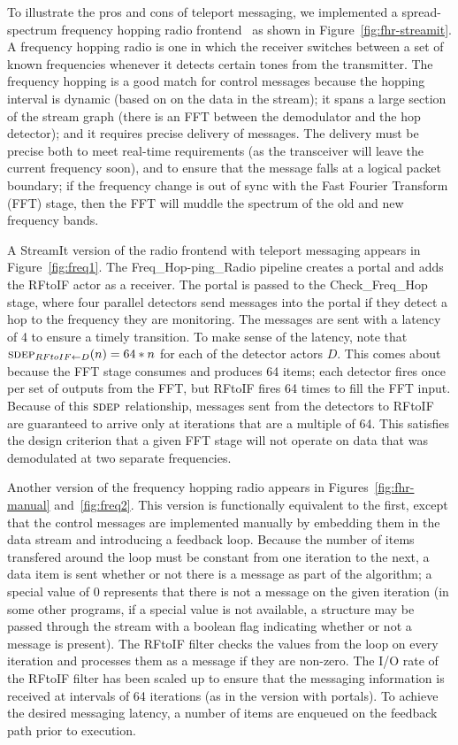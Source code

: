 To illustrate the pros and cons of teleport messaging, we implemented
a spread-spectrum frequency hopping radio frontend~\cite{harada02} as
shown in Figure~\ref{fig:fhr-streamit}.  A frequency hopping radio is
one in which the receiver switches between a set of known frequencies
whenever it detects certain tones from the transmitter.  The frequency
hopping is a good match for control messages because the hopping
interval is dynamic (based on on the data in the stream); it spans a
large section of the stream graph (there is an FFT between the
demodulator and the hop detector); and it requires precise delivery of
messages.  The delivery must be precise both to meet real-time
requirements (as the transceiver will leave the current frequency
soon), and to ensure that the message falls at a logical packet
boundary; if the frequency change is out of sync with the Fast Fourier
Transform (FFT) stage, then the FFT will muddle the spectrum of the
old and new frequency bands.

A StreamIt version of the radio frontend with teleport messaging
appears in Figure~\ref{fig:freq1}.  The Freq\_Hop-ping\_Radio pipeline
creates a portal and adds the RFtoIF actor as a receiver.  The portal
is passed to the Check\_Freq\_Hop stage, where four parallel detectors
send messages into the portal if they detect a hop to the frequency
they are monitoring.  The messages are sent with a latency of 4 to
ensure a timely transition.  To make sense of the latency, note that
$\sdepf{RFtoIF}{D}(n) = 64*n$ for each of the detector actors $D$.
This comes about because the FFT stage consumes and produces 64 items;
each detector fires once per set of outputs from the FFT, but RFtoIF
fires 64 times to fill the FFT input.  Because of this $\textsc{sdep}$
relationship, messages sent from the detectors to RFtoIF are
guaranteed to arrive only at iterations that are a multiple of 64.
This satisfies the design criterion that a given FFT stage will not
operate on data that was demodulated at two separate frequencies.

Another version of the frequency hopping radio appears in
Figures~\ref{fig:fhr-manual} and~\ref{fig:freq2}.  This version is
functionally equivalent to the first, except that the control messages
are implemented manually by embedding them in the data stream and
introducing a feedback loop.  Because the number of items transfered
around the loop must be constant from one iteration to the next, a
data item is sent whether or not there is a message as part of the
algorithm; a special value of 0 represents that there is not a message
on the given iteration (in some other programs, if a special value is
not available, a structure may be passed through the stream with a
boolean flag indicating whether or not a message is present).  The
RFtoIF filter checks the values from the loop on every iteration and
processes them as a message if they are non-zero.  The I/O rate of the
RFtoIF filter has been scaled up to ensure that the messaging
information is received at intervals of 64 iterations (as in the
version with portals).  To achieve the desired messaging latency, a
number of items are enqueued on the feedback path prior to execution.

